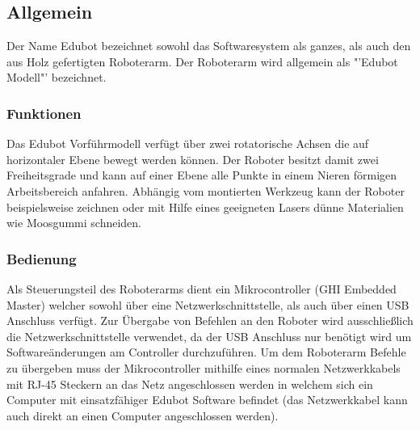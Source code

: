 \subsection{Allgemein}            
Der Name Edubot bezeichnet sowohl das Softwaresystem als ganzes, als auch den aus Holz gefertigten Roboterarm. Der Roboterarm wird allgemein als "'Edubot Modell"' bezeichnet.

\subsubsection{Funktionen}
Das Edubot Vorführmodell verfügt über zwei rotatorische Achsen die auf horizontaler Ebene bewegt werden können. 
Der Roboter besitzt damit zwei Freiheitsgrade und kann auf einer Ebene alle Punkte in einem Nieren förmigen Arbeitsbereich anfahren. Abhängig vom montierten Werkzeug kann der Roboter beispielsweise zeichnen oder mit Hilfe eines geeigneten Lasers dünne Materialien wie Moosgummi schneiden.

\subsubsection{Bedienung}
Als Steuerungsteil des Roboterarms dient ein Mikrocontroller (GHI Embedded Master) welcher sowohl über eine Netzwerkschnittstelle, als auch über einen USB Anschluss verfügt. Zur Übergabe von Befehlen an den Roboter wird ausschließlich die Netzwerkschnittstelle verwendet, da der USB Anschluss nur benötigt wird um Softwareänderungen am Controller durchzuführen.
Um dem Roboterarm Befehle zu übergeben muss der Mikrocontroller mithilfe eines normalen Netzwerkkabels mit RJ-45 Steckern an das Netz angeschlossen werden in welchem sich ein Computer mit einsatzfähiger Edubot Software befindet (das Netzwerkkabel kann auch direkt an einen Computer angeschlossen werden).